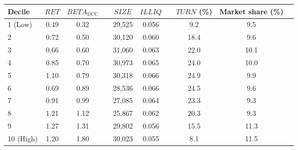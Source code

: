 \begin{tabular}{@{}lccccccccc@{}}
	\toprule
	Decile & $\textit{RET}$ & $\textit{BETA}_\textrm{DCC}$ && $\textit{SIZE}$ & $\textit{ILLIQ}$ && $\textit{TURN}$ (\%) & Market share (\%) \\ \midrule
1 (Low) & 0.49 & 0.32 && 29,525 & 0.056 && 9.2 & 9.5 \\
2       & 0.72 & 0.50 && 30,120 & 0.060 && 18.4 & 9.6 \\
3       & 0.66 & 0.60 && 31,060 & 0.063 && 22.0 & 10.1 \\
4       & 0.85 & 0.70 && 30,973 & 0.065 && 24.0 & 10.0 \\
5       & 1.10 & 0.79 && 30,318 & 0.066 && 24.9 & 9.9 \\
6       & 0.69 & 0.89 && 28,536 & 0.066 && 24.5 & 9.6 \\
7       & 0.91 & 0.99 && 27,085 & 0.064 && 23.3 & 9.3 \\
8       & 1.21 & 1.12 && 25,867 & 0.062 && 20.3 & 9.3 \\
9       & 1.27 & 1.31 && 29,802 & 0.056 && 15.5 & 11.3 \\
10 (High) & 1.20 & 1.80 && 30,023 & 0.055 && 8.1 & 11.5 \\
	\bottomrule
\end{tabular}
